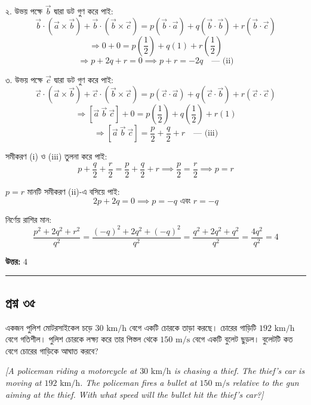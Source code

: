 \documentclass[11pt,a4paper]{article}
\begin{document}
২. উভয় পক্ষে $\vec{b}$ দ্বারা ডট গুণ করে পাই:
$$\vec{b} \cdot (\vec{a} \times \vec{b}) + \vec{b} \cdot (\vec{b} \times \vec{c}) = p(\vec{b} \cdot \vec{a}) + q(\vec{b} \cdot \vec{b}) + r(\vec{b} \cdot \vec{c})$$
$$\Rightarrow 0 + 0 = p\left(\frac{1}{2}\right) + q(1) + r\left(\frac{1}{2}\right)$$
$$\Rightarrow p + 2q + r = 0 \implies p + r = -2q \quad \text{--- (ii)}$$

৩. উভয় পক্ষে $\vec{c}$ দ্বারা ডট গুণ করে পাই:
$$\vec{c} \cdot (\vec{a} \times \vec{b}) + \vec{c} \cdot (\vec{b} \times \vec{c}) = p(\vec{c} \cdot \vec{a}) + q(\vec{c} \cdot \vec{b}) + r(\vec{c} \cdot \vec{c})$$
$$\Rightarrow [\vec{a} \ \vec{b} \ \vec{c}] + 0 = p\left(\frac{1}{2}\right) + q\left(\frac{1}{2}\right) + r(1)$$
$$\Rightarrow [\vec{a} \ \vec{b} \ \vec{c}] = \frac{p}{2} + \frac{q}{2} + r \quad \text{--- (iii)}$$

সমীকরণ (i) ও (iii) তুলনা করে পাই:
$$p + \frac{q}{2} + \frac{r}{2} = \frac{p}{2} + \frac{q}{2} + r \implies \frac{p}{2} = \frac{r}{2} \implies p = r$$

$p = r$ মানটি সমীকরণ (ii)-এ বসিয়ে পাই:
$$2p + 2q = 0 \implies p = -q \text{ এবং } r = -q$$

নির্ণেয় রাশির মান:
$$\frac{p^2 + 2q^2 + r^2}{q^2} = \frac{(-q)^2 + 2q^2 + (-q)^2}{q^2} = \frac{q^2 + 2q^2 + q^2}{q^2} = \frac{4q^2}{q^2} = 4$$

\textbf{উত্তর:} $4$

\vspace{0.5cm}
\hrule
\vspace{0.5cm}

\subsection*{প্রশ্ন ৩৫}

একজন পুলিশ মোটরসাইকেল চড়ে $30\text{ km/h}$ বেগে একটি চোরকে তাড়া করছে। চোরের গাড়িটি $192\text{ km/h}$ বেগে গতিশীল। পুলিশ চোরকে লক্ষ্য করে তার পিস্তল থেকে $150\text{ m/s}$ বেগে একটি বুলেট ছুড়ল। বুলেটটি কত বেগে চোরের গাড়িকে আঘাত করবে?

\smallskip
\textit{[A policeman riding a motorcycle at $30\text{ km/h}$ is chasing a thief. The thief's car is moving at $192\text{ km/h}$. The policeman fires a bullet at $150\text{ m/s}$ relative to the gun aiming at the thief. With what speed will the bullet hit the thief's car?]}
\end{document}
